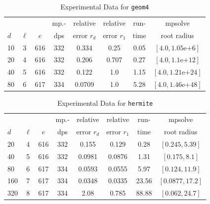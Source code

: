 \documentclass[runningheads]{llncs}
\begin{document}
\begin{table}
\caption{Experimental Data for \texttt{geom4}} %
\label{tab:geom4}
\vskip -0.15in
\begin{center}
\begin{small}
\begin{sc}
\begin{tabular}{lccccccc}
\toprule
&  &  & mp.-& relative  & relative & run- & mpsolve \\
$d$& $\ell$& $e$ & dps&error $r_d$       & error $r_1$ &time& root radius\\
\midrule
 10 & 3 & 616 & 332 & 0.334 & 0.25 & 0.05 & $[4.0, 1.05\text{e+}6]$\\
 20 & 4 & 616 & 332 & 0.206 & 0.707 & 0.27 & $[4.0, 1.1\text{e+}12]$\\
 40 & 5 & 616 & 332 & 0.122 & 1.0 & 1.15 & $[4.0, 1.21\text{e+}24]$\\
 80 & 6 & 617 & 334 & 0.0709 & 1.0 & 5.28 & $[4.0, 1.46\text{e+}48]$\\
\bottomrule
\end{tabular}
\end{sc}
\end{small}
\end{center}
\vskip 0.05in
\end{table}

\begin{table}
\caption{Experimental Data for \texttt{hermite}} %
\label{tab:hermite}
\vskip -0.15in
\begin{center}
\begin{small}
\begin{sc}
\begin{tabular}{lccccccc}
\toprule
&  &  & mp.-& relative  & relative & run- & mpsolve \\
$d$& $\ell$& $e$ & dps&error $r_d$       & error $r_1$ &time& root radius\\
\midrule
 20 & 4 & 616 & 332 & 0.155 & 0.129 & 0.28 & $[0.245, 5.39]$\\
 40 & 5 & 616 & 332 & 0.0981 & 0.0876 & 1.31 & $[0.175, 8.1]$\\
 80 & 6 & 617 & 334 & 0.0593 & 0.0555 & 5.97 & $[0.124, 11.9]$\\
 160 & 7 & 617 & 334 & 0.0348 & 0.0335 & 23.56 & $[0.0877, 17.2]$\\
 320 & 8 & 617 & 334 & 2.08 & 0.785 & 88.88 & $[0.062, 24.7]$\\
\bottomrule
\end{tabular}
\end{sc}
\end{small}
\end{center}
\vskip 0.05in
\end{table}
\end{document}
